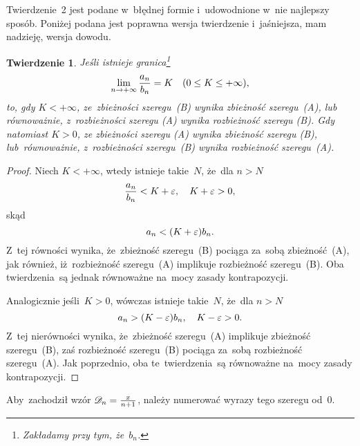 \documentclass[a4paper,11pt]{article}
\newtheorem{twr}{Twierdzenie}  %
\begin{document}
\start {} Twierdzenie~2 jest podane w~błędnej formie
i~udowodnione w~nie najlepszy sposób. Poniżej podana jest poprawna
wersja twierdzenie i~jaśniejsza, mam nadzieję, wersja dowodu.
\begin{twr}
  \label{thm:FichtenholzVolII-02}
  Jeśli istnieje granica\footnote{Zakładamy przy tym, że~$b_{ n }$.}
  \begin{equation}
    \label{eq:FichtenholzVolII-12}
    \lim\limits_{ n \to +\infty } \frac{ a_{ n } }{ b_{ n } } = K
    \quad ( 0 \leq K \leq +\infty ),
  \end{equation}
  to, gdy $K < +\infty$, ze~zbieżności szeregu~(B) wynika zbieżność
  szeregu~(A), lub równoważnie, z~rozbieżności szeregu (A) wynika
  rozbieżność szeregu (B). Gdy natomiast $K > 0$, ze zbieżności
  szeregu (A) wynika zbieżność szeregu (B), lub~równoważnie,
  z~rozbieżności szeregu~(B) wynika rozbieżność szeregu~(A).
\end{twr}
\begin{proof}
  Niech $K < +\infty$, wtedy istnieje takie~$N$, że~dla $n > N$
  \begin{equation}
    \label{eq:FichtenholzVolII-13}
    \frac{ a_{ n } }{ b_{ n } } < K + \varepsilon,
    \quad K + \varepsilon > 0,
  \end{equation}
  skąd
  \begin{equation}
    \label{eq:FichtenholzVolII-14}
    a_{ n } < ( K + \varepsilon ) b_{ n }.
  \end{equation}
  Z~tej równości wynika, że~zbieżność szeregu~(B) pociąga za~sobą
  zbieżność~(A), jak również, iż~rozbieżność szeregu~(A) implikuje
  rozbieżność szeregu~(B). Oba twierdzenia~są jednak równoważne
  na~mocy zasady kontrapozycji.

  Analogicznie jeśli~$K > 0$, wówczas istnieje takie~$N$, że~dla
  $n > N$
  \begin{equation}
    \label{eq:FichtenholzVolII-15}
    a_{ n } > ( K - \varepsilon ) b_{ n },
    \quad K - \varepsilon > 0.
  \end{equation}
  Z~tej nierówności wynika, że~zbieżność szeregu~(A) implikuje
  zbieżność szeregu~(B), zaś rozbieżność szeregu~(B) pociąga za~sobą
  rozbieżność szeregu~(A). Jak poprzednio, oba te~twierdzenia~są
  równoważne na~mocy zasady kontrapozycji.
\end{proof}

\vspace{\spaceFour}


\start {} Aby~zachodził wzór
$\mathcal{D}_{ n } = \tfrac{ x }{ n + 1 }$, należy numerować wyrazy tego
szeregu od~0.
\end{document}
